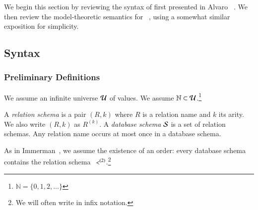 
We begin this section by reviewing the syntax of \lang first presented
in Alvaro \etal~\cite{dedalus}. We then review the model-theoretic semantics for \lang~\cite{ameloot-operational}, using a somewhat similar exposition for simplicity.


\subsection{Syntax}

\subsubsection{Preliminary Definitions}


We assume an infinite universe $\univ$ of values.  We assume $\mathbb{N} \subset \univ$.\footnote{$\mathbb{N} = \{0, 1, 2, \ldots\}$}

A {\em relation schema} is a pair $(R,k)$ where $R$ is a relation name and $k$ its arity.  We also write $(R,k)$ as $R^{(k)}$.
A {\em database schema} $\schema$ is a set of relation schemas.  Any relation name occurs at most once in a database schema.

As in Immerman~\cite{immerman-ptime}, we assume
the existence of an order: every database schema contains the relation schema
$\dedalus{<}^{(2)}$.\footnote{We will often write \dedalus{<} in infix notation.}  

